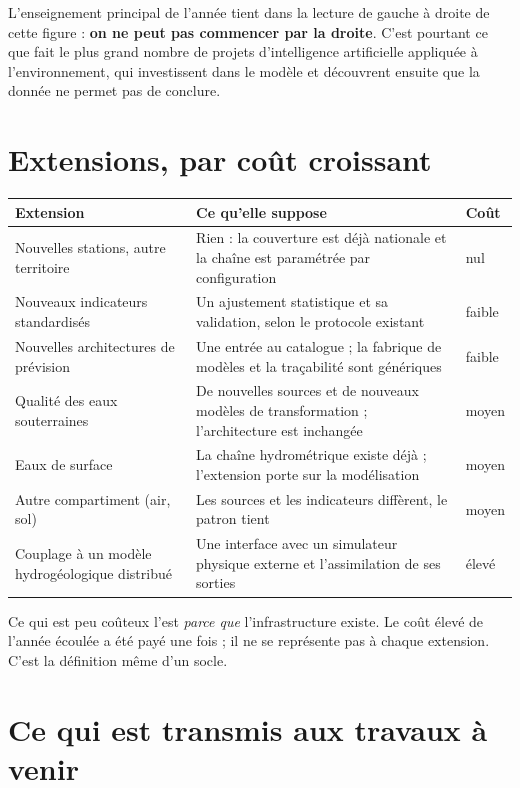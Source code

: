 L'enseignement principal de l'année tient dans la lecture de gauche à droite de cette figure :
\textbf{on ne peut pas commencer par la droite}. C'est pourtant ce que fait le plus grand nombre
de projets d'intelligence artificielle appliquée à l'environnement, qui investissent dans le
modèle et découvrent ensuite que la donnée ne permet pas de conclure.

\section{Extensions, par coût croissant}

\begin{center}
\begin{tabularx}{\textwidth}{@{}lXl@{}}
\toprule
\textbf{Extension} & \textbf{Ce qu'elle suppose} & \textbf{Coût} \\
\midrule
Nouvelles stations, autre territoire & Rien : la couverture est déjà nationale et la chaîne est
paramétrée par configuration & nul \\
Nouveaux indicateurs standardisés & Un ajustement statistique et sa validation, selon le
protocole existant & faible \\
Nouvelles architectures de prévision & Une entrée au catalogue ; la fabrique de modèles et la
traçabilité sont génériques & faible \\
Qualité des eaux souterraines & De nouvelles sources et de nouveaux modèles de transformation ;
l'architecture est inchangée & moyen \\
Eaux de surface & La chaîne hydrométrique existe déjà ; l'extension porte sur la modélisation &
moyen \\
Autre compartiment (air, sol) & Les sources et les indicateurs diffèrent, le patron tient &
moyen \\
Couplage à un modèle hydrogéologique distribué & Une interface avec un simulateur physique
externe et l'assimilation de ses sorties & élevé \\
\bottomrule
\end{tabularx}
\end{center}

Ce qui est peu coûteux l'est \emph{parce que}
l'infrastructure existe. Le coût élevé de l'année écoulée a été payé une fois ; il ne se
représente pas à chaque extension. C'est la définition même d'un socle.

\section{Ce qui est transmis aux travaux à venir}

